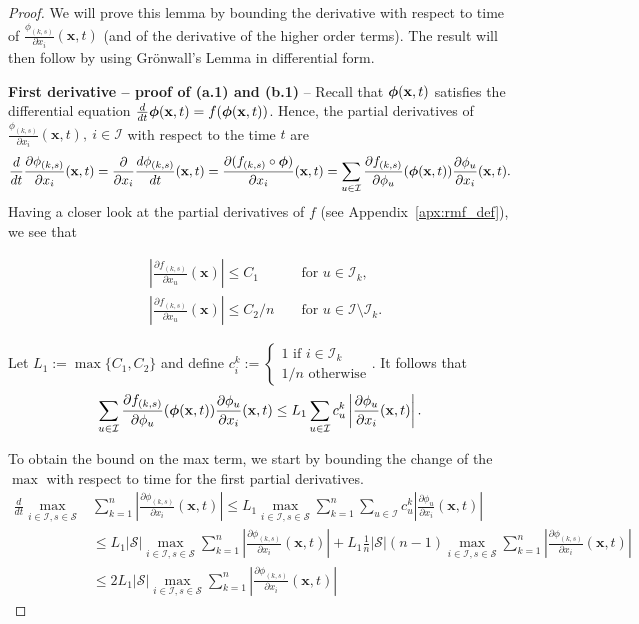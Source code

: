 \documentclass[acmsmall]{acmart}
\newcommand\bx{\mathbf{x}}
\newcommand\bphi{\text{\boldmath$\phi$}}
\newcommand\calI{\mathcal{I}}
\newcommand\calS{\mathcal{S}}
\newcommand\abs[1]{\left|#1\right|}         %
\begin{document}
\begin{proof}
  We will prove this lemma by bounding the derivative with respect to time of $\frac{\phi_{(k,s)}}{\partial x_i}(\bx,t)$ (and of the derivative of the higher order terms). The result will then follow by using Grönwall's Lemma in differential form.

  \textbf{First derivative -- proof of (a.1) and (b.1)} -- Recall that $\bphi(\bx,t)$ satisfies the differential equation $\frac{d}{dt}\bphi(\bx,t) = f(\bphi(\bx,t))$. Hence, the partial derivatives of $\frac{\phi_{(k,s)}}{\partial x_i}(\bx,t), \ i \in \calI$ with respect to the time $t$ are
\begin{align*}
\frac{d}{dt}\frac{\partial \phi_{(k,s)}}{\partial x_i}(\bx,t) = \frac{\partial}{\partial x_i} \frac{d\phi_{(k,s)}}{dt} (\bx,t) = \frac{\partial (f_{(k,s)} \circ \bphi)}{\partial x_i} (\bx,t) = \sum_{u\in \calI} \frac{\partial f_{(k,s)}}{\partial \phi_{u}}(\bphi(\bx,t))\frac{\partial \phi_{u}}{\partial x_{i}}(\bx,t). \\
\end{align*}
Having a closer look at the partial derivatives of $f$ (see Appendix~\ref{apx:rmf_def}), we see that


\begin{align*}
& \abs{\frac{\partial f_{(k,s)}}{\partial x_u}(\bx)} \leq C_1 
&& \text{ for } u \in \calI_{k}, \\
& \abs{\frac{\partial f_{(k,s)}}{\partial x_u}(\bx)} \leq C_2/n && \text{ for } u \in \calI \setminus \calI_{k}.
\end{align*}


Let $L_1 := \max\{C_1,C_2\}$ and define $c^k_{i}:=\begin{cases}1 \text{ if } i \in \calI_k \\ 1/n \text{ otherwise}\end{cases}$. It follows that
\begin{align*}
\sum_{u\in \calI} \frac{\partial f_{(k,s)}}{\partial \phi_{u}}(\bphi(\bx,t))\frac{\partial \phi_{u}}{\partial x_{i}}(\bx,t) \leq L_{1}\sum_{u\in \calI} c_u^k \abs{\frac{\partial \phi_{u}}{\partial x_{i}}(\bx,t)}.
\end{align*}


To obtain the bound on the max term, we start by bounding the change of the $\max$ with respect to time for the first partial derivatives. 
\begin{align*}
\frac{d}{dt}\max_{i\in\calI, s\in \calS} & \sum_{k=1}^{n} \abs{\frac{\partial \phi_{(k,s)}}{\partial x_{i}}(\bx,t)} 
\leq L_{1} \max_{i\in\calI, s\in \calS}\sum_{k=1}^{n} \sum_{u\in \calI}c_u^k \abs{\frac{\partial \phi_{u}}{\partial x_{i}}(\bx,t)} \\
& \leq L_{1}\abs{\calS} \max_{i\in\calI, s\in \calS} \sum_{k=1}^{n} \abs{\frac{\partial \phi_{(k,s)}}{\partial x_{i}}(\bx,t)} + L_{1}\frac{1}{n}\abs{\calS}(n-1) \max_{i\in\calI, s\in \calS} \sum_{k=1}^{n} \abs{\frac{\partial \phi_{(k,s)}}{\partial x_{i}}(\bx,t)} \\
& \leq 2L_{1}\abs{\calS} \max_{i\in\calI, s\in \calS} \sum_{k=1}^{n} \abs{\frac{\partial \phi_{(k,s)}}{\partial x_{i}}(\bx,t)}
\end{align*}


\end{proof}
\end{document}

